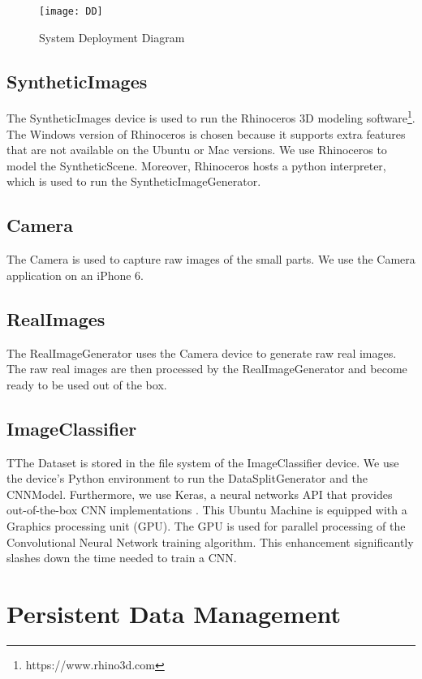 \begin{figure}[h]
\centering
  \texttt{[image: DD]}
\caption{System Deployment Diagram}
\label{fig:DD}
\end{figure}

\subsection{SyntheticImages}
The SyntheticImages device is used to run the Rhinoceros 3D modeling software\footnote{https://www.rhino3d.com}. The Windows version of Rhinoceros is chosen because it supports extra features that are not available on the Ubuntu or Mac versions. We use Rhinoceros to model the SyntheticScene. Moreover, Rhinoceros hosts a python interpreter, which is used to run the SyntheticImageGenerator.

\subsection{Camera}
The Camera is used to capture raw images of the small parts. We use the Camera application on an iPhone 6.

\subsection{RealImages}
The RealImageGenerator uses the Camera device to generate raw real images. The raw real images are then processed by the RealImageGenerator and become ready to be used out of the box.

\subsection{ImageClassifier}
TThe Dataset is stored in the file system of the ImageClassifier device. We use the device's Python environment to run the DataSplitGenerator and the CNNModel. Furthermore, we use Keras, a neural networks API that provides out-of-the-box CNN implementations \cite{chollet2015keras}. This Ubuntu Machine is equipped with a Graphics processing unit (GPU). The GPU is used for parallel processing of the Convolutional Neural Network training algorithm. This enhancement significantly slashes down the time needed to train a CNN.

\section{Persistent Data Management}


